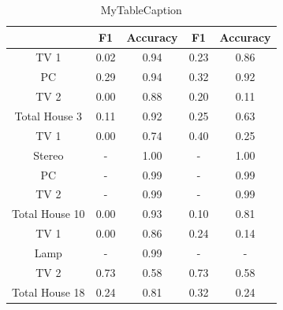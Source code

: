 \begin{table}[H]                             
\centering                                   
\begin{tabular}{c|c|c|c|c|}                 
\hline                                       
 & F1 & Accuracy & F1 & Accuracy \\          
\hline                                       
TV 1 & 0.02 & 0.94 & 0.23 & 0.86 \\          
\hline                                       
PC & 0.29 & 0.94 & 0.32 & 0.92 \\            
\hline                                       
TV 2 & 0.00 & 0.88 & 0.20 & 0.11 \\          
\hline                                       
Total House 3 & 0.11 & 0.92 & 0.25 & 0.63 \\ 
\hline                                       
TV 1 & 0.00 & 0.74 & 0.40 & 0.25 \\          
\hline                                       
Stereo & - & 1.00 & - & 1.00 \\              
\hline                                       
PC & - & 0.99 & - & 0.99 \\                  
\hline                                       
TV 2 & - & 0.99 & - & 0.99 \\                
\hline                                       
Total House 10 & 0.00 & 0.93 & 0.10 & 0.81 \\
\hline                                       
TV 1 & 0.00 & 0.86 & 0.24 & 0.14 \\          
\hline                                       
Lamp & - & 0.99 & - & - \\                   
\hline                                       
TV 2 & 0.73 & 0.58 & 0.73 & 0.58 \\          
\hline                                       
Total House 18 & 0.24 & 0.81 & 0.32 & 0.24 \\
\hline                                       
\end{tabular}                                
\caption{MyTableCaption}                     
\label{table:Tab:SHGREALSIM}                 
\end{table}    


